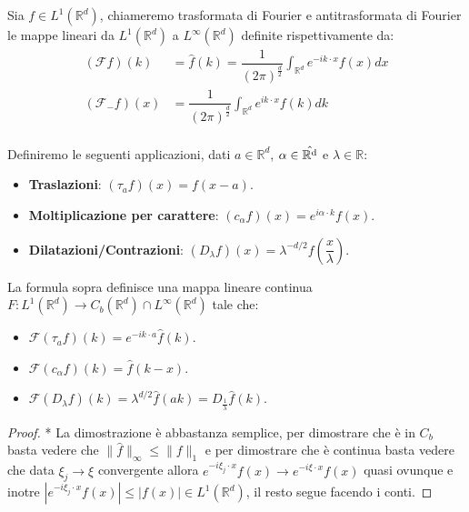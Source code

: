 \begin{definition}
    Sia $f \in L^1(\mathbb{R}^d)$, chiameremo trasformata di Fourier e antitrasformata di Fourier le mappe lineari da $L^1(\mathbb{R}^d) $ a $ L^\infty(\mathbb{R}^d)$ definite rispettivamente da: 
    \begin{align*}
      (\mathcal{F} f)(k) &= \hat{f}(k) = \dfrac{1}{(2 \pi)^\frac{d}{2}}\int_{\mathbb{R}^d} e^{-i k \cdot x} f(x)  dx \\
    (\mathcal{F}_- f)(x) &= \dfrac{1}{(2 \pi)^\frac{d}{2}}\int_{\mathbb{R}^d} e^{i k \cdot x} f(k)  dk \\
    \end{align*}

\end{definition}

Definiremo le seguenti applicazioni, dati $a \in \mathbb{R}^d$,  $\alpha \in \operatorname{\hat{\mathbb{R}^d}}$ e $\lambda \in \mathbb{R}$:
\begin{itemize}
    \item \textbf{Traslazioni}: $(\tau_a f)(x) = f(x - a)$.
    \item \textbf{Moltiplicazione per carattere}: $(c_\alpha f)(x) = e^{i \alpha \cdot k} f(x)$.
    \item \textbf{Dilatazioni/Contrazioni}: $(D_\lambda f)(x) = \lambda^{-d/2} f(\dfrac{x}{\lambda})$.
\end{itemize}

\begin{proposition}
 La formula sopra definisce una mappa lineare continua $F: L^1(\mathbb{R}^d) \to C_b(\mathbb{R}^d) \cap L^\infty(\mathbb{R}^d)$ tale che:
\begin{itemize}
    \item $\mathcal{F}(\tau_a f)(k) = e^{-i k \cdot a} \hat{f}(k)$.
    \item $\mathcal{F}(c_\alpha f)(k) = \hat{f}(k - x)$.
    \item $\mathcal{F}(D_\lambda f)(k) = \lambda^{d/2} \hat{f}(a k)= D_\frac{1}{\lambda} \hat{f}(k)$.
\end{itemize}
\end{proposition}

\begin{proof} *
    La dimostrazione è abbastanza semplice, per dimostrare che è in $C_b$ basta vedere che $\| \hat{f}\|_\infty \leq \| f\|_1$ e per dimostrare che è continua basta vedere che data $\xi_j \to \xi$ convergente allora $e^{-i \xi_j \cdot x} f(x) \to e^{-i \xi \cdot x} f(x)$ quasi ovunque e inotre $|e^{-i \xi_j \cdot x} f(x)| \leq |f(x)| \in L^1(\mathbb{R}^d)$, il resto segue facendo i conti.
\end{proof}


